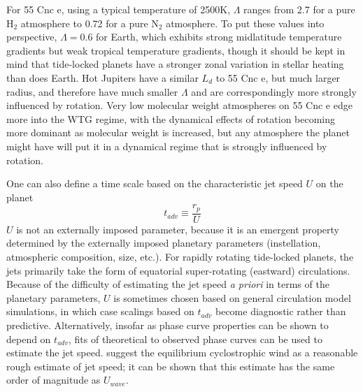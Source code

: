 For 55 Cnc e, using a typical temperature of 2500K, $\Lambda$ ranges from 2.7 for a pure $\mathrm{H_2}$ atmosphere to 0.72 for a pure $\mathrm{N_2}$ atmosphere.  To put these values into perspective, $\Lambda = 0.6$ for Earth, which exhibits strong midlatitude temperature gradients but weak tropical temperature gradients, though it should be kept in mind that tide-locked planets have a stronger zonal variation in stellar heating than does Earth.  Hot Jupiters have a similar $L_d$ to 55 Cnc e, but much larger radius, and therefore have much smaller $\Lambda$ and are correspondingly more strongly influenced by rotation.  Very low molecular weight atmospheres on 55 Cnc e edge more into the WTG regime, with the dynamical effects of rotation becoming more dominant as molecular weight is increased, but any atmosphere  the planet might have will put it in a dynamical regime that is strongly influenced by rotation.

One can also define a time scale based on the characteristic jet speed $U$ on the planet
\begin{equation}
t_{adv} \equiv \frac{r_{p}}{U}
\end{equation}
$U$ is not an externally imposed parameter, because it is an emergent property determined by the externally imposed planetary parameters (instellation, atmospheric composition, size, etc.). For rapidly rotating tide-locked planets, the jets primarily take the form of equatorial super-rotating (eastward) circulations.  Because of the difficulty of estimating the jet speed {\it a priori} in terms of the planetary parameters, $U$ is sometimes chosen based on general circulation model simulations, in which case scalings based on $t_{adv}$ become diagnostic rather than predictive. Alternatively, insofar as phase curve properties can be shown to depend on $t_{adv}$, fits of theoretical to observed phase curves can be used to estimate the jet speed. \citet{zhang2016effects} suggest the equilibrium cyclostrophic wind as a reasonable rough estimate of jet speed; it can be shown that this estimate has the same order of magnitude as $U_{wave}$.

